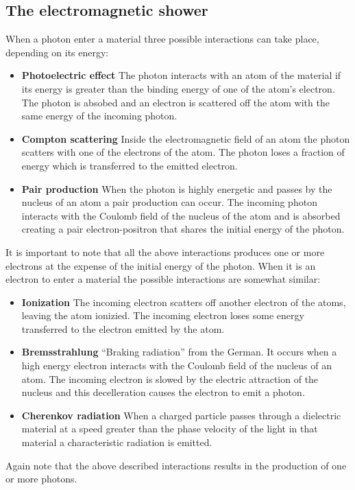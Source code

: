 \subsection{The electromagnetic shower}
When a photon enter a material three possible interactions can take place, depending on its energy:
\begin{itemize}
\item \textbf{Photoelectric effect} The photon interacts with an atom of the material if its energy is greater than the binding energy of one of the atom's electron. The photon is absobed and an electron is scattered off the atom with the same energy of the incoming photon.
\item \textbf{Compton scattering} Inside the electromagnetic field of an atom the photon scatters with one of the electrons of the atom. The photon loses a fraction of energy which is transferred to the emitted electron.
\item \textbf{Pair production} When the photon is highly energetic and passes by the nucleus of an atom a pair production can occur. The incoming photon interacts with the Coulomb field of the nucleus of the atom and is absorbed creating a pair electron-positron that shares the initial energy of the photon.
\end{itemize}

It is important to note that all the above interactions produces one or more electrons at the expense of the initial energy of the photon.
When it is an electron to enter a material the possible interactions are somewhat similar:
\begin{itemize}
\item \textbf{Ionization} The incoming electron scatters off another electron of the atoms, leaving the atom ionizied. The incoming electron loses some energy transferred to the electron emitted by the atom.
\item \textbf{Bremsstrahlung} ``Braking radiation'' from the German. It occurs when a high energy electron interacts with the Coulomb field of the nucleus of an atom. The incoming electron is slowed by the electric attraction of the nucleus and this decelleration causes the electron to emit a photon.
\item \textbf{Cherenkov radiation} When a charged particle passes through a dielectric material at a speed greater than the phase velocity of the light in that material a characteristic radiation is emitted. 
\end{itemize}

Again note that the above described interactions results in the production of one or more photons.\\

